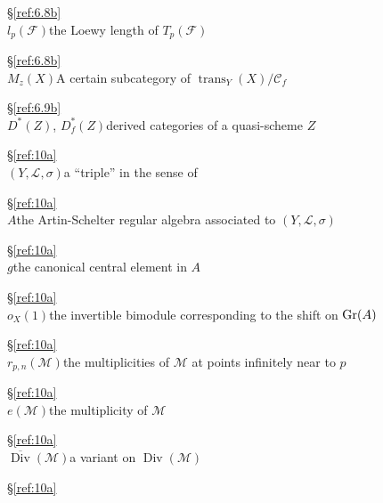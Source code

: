 \documentclass{amsproc}
\def\Cscr{{\mathcal C}}
\def\Fscr{{\mathcal F}}
\def\Lscr{{\mathcal L}}
\def\Mscr{{\mathcal M}}
\def\Gr{\mathop{\text{Gr}}}
\def\trans{\operatorname{trans}}
\def\Div{\operatorname{Div}}
\let\oldtext\text
\def\text#1{\oldtext{\upshape #1}}
\theoremstyle{definition}
\theoremstyle{remark}
\numberwithin{equation}{section}
\numberwithin{table}{section}
\numberwithin{figure}{section}
\def\Gr{\mathop{\text{Gr}}}
\begin{document}
\begin{tabbing}
\>\strut\hfill\S\ref{ref:6.8b}\>\\
$l_p(\Fscr)$\>the Loewy length of $T_p(\Fscr)$
\>\strut\hfill\S\ref{ref:6.8b}\>\\
$M_z(X)$\>A certain subcategory of $\trans_Y(X)/\Cscr_f$
\>\strut\hfill\S\ref{ref:6.9b}\>\\
$D^\ast(Z)$, $D^\ast_f(Z)$\>derived categories of a quasi-scheme $Z$
\>\strut\hfill\S\ref{ref:10a}\>\\
$(Y,\Lscr,\sigma)$\>a ``triple'' in the sense of \cite{ATV1}
\>\strut\hfill\S\ref{ref:10a}\>\\
$A$\>the Artin-Schelter regular algebra associated to
$(Y,\Lscr,\sigma)$
\>\strut\hfill\S\ref{ref:10a}\>\\
$g$\>the canonical central element in $A$
\>\strut\hfill\S\ref{ref:10a}\>\\
$o_X(1)$\>the invertible bimodule corresponding to the shift on $\Gr(A)$
\>\strut\hfill\S\ref{ref:10a}\>\\
$r_{p,n}(\Mscr)$\>the multiplicities of $\Mscr$ at points infinitely
near to $p$
\>\strut\hfill\S\ref{ref:10a}\>\\
$e(\Mscr)$\>the multiplicity of $\Mscr$
\>\strut\hfill\S\ref{ref:10a}\>\\
$\overline{\Div}(\Mscr)$\>a variant on $\Div(\Mscr)$
\>\strut\hfill\S\ref{ref:10a}\>
\end{tabbing}
\end{document}
